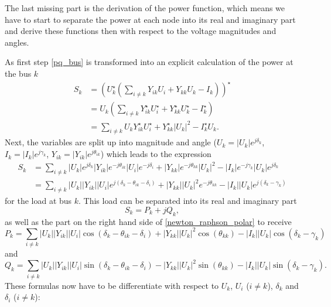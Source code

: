 The last missing part is the derivation of the power function, which means we have to start to separate the power at each node into its real and imaginary part and derive these functions then with respect to the voltage magnitudes and angles.

As first step \eqref{pq_bus} is transformed into an explicit calculation of the power at the bus $k$
\begin{align}
	S_k &= \left( U_k^\star \left( \sum_{i \ne k} Y_{ik} U_i + Y_{kk} U_k - I_k \right) \right)^\star \\
		&= U_k \left( \sum_{i \ne k} Y_{ik}^\star U_i^\star + Y_{kk}^\star U_k^\star - I_k^\star \right) \\
		&= \sum_{i \ne k} U_k Y_{ik}^\star U_i^\star + Y_{kk}^\star |U_k|^2 - I_k^\star U_k.
\end{align}
Next, the variables are split up into magnitude and angle ($U_k = |U_k| e^{j \delta_k}$, $I_k = |I_k| e^{j \gamma_k}$, $Y_{ik} = |Y_{ik}| e^{j \theta_{ik}}$) which leads to the expression
\begin{align}
	S_k &= \sum_{i \ne k} |U_k| e^{j \delta_k} |Y_{ik}| e^{-j \theta_{ik}} |U_i| e^{-j \delta_i} + |Y_{kk}| e^{-j \theta_{kk}} |U_k|^2 - |I_k| e^{-j \gamma_k} |U_k| e^{j \delta_k} \\
		&= \sum_{i \ne k} |U_k| |Y_{ik}| |U_i| e^{j \left( \delta_k - \theta_{ik} - \delta_i \right)} + |Y_{kk}| |U_k|^2 e^{-j \theta_{kk}} - |I_k| |U_k| e^{j \left( \delta_k - \gamma_k \right)}
		\label{eq:newton_raphson_polar}
\end{align}
for the load at bus $k$. This load can be separated into its real and imaginary part
\begin{equation}
	S_k = P_k + j Q_k,
\end{equation}
as well as the part on the right hand side of \eqref{newton_raphson_polar} to receive
\begin{equation}
	P_k = \sum_{i \ne k} |U_k| |Y_{ik}| |U_i| \cos \left( \delta_k - \theta_{ik} - \delta_i \right) + |Y_{kk}| |U_k|^2 \cos \left( \theta_{kk} \right) - |I_k| |U_k| \cos \left( \delta_k - \gamma_k \right)
\end{equation}
and
\begin{equation}
	Q_k = \sum_{i \ne k} |U_k| |Y_{ik}| |U_i| \sin \left( \delta_k - \theta_{ik} - \delta_i \right) - |Y_{kk}| |U_k|^2 \sin \left( \theta_{kk} \right) - |I_k| |U_k| \sin \left( \delta_k - \gamma_k \right).
\end{equation}
These formulas now have to be differentiate with respect to $U_k$, $U_i$ ($i \ne k$), $\delta_k$ and $\delta_i$ ($i \ne k$):
